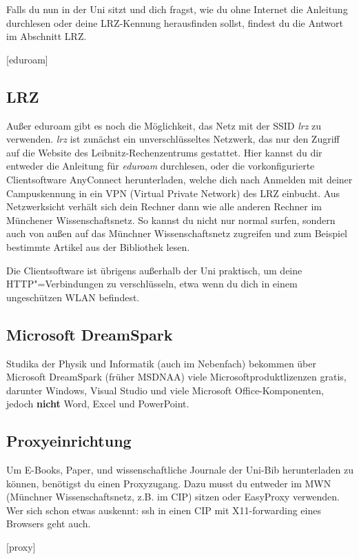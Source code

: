 Falls du nun in der Uni sitzt und dich fragst, wie du ohne Internet
die Anleitung durchlesen oder deine LRZ-Kennung herausfinden sollst, 
findest du die Antwort im Abschnitt LRZ.
\begin{urlList}
	[eduroam]
\end{urlList}

\subsection*{LRZ}
Außer eduroam gibt es noch die Möglichkeit, das Netz mit der SSID
\emph{lrz} zu verwenden. \emph{lrz} ist zunächst ein unverschlüsseltes
Netzwerk, das nur den Zugriff auf die Website des
Leibnitz-Rechenzentrums gestattet. Hier kannst du dir entweder die 
Anleitung für \emph{eduroam} durchlesen, oder die
vorkonfigurierte Clientsoftware AnyConnect herunterladen, welche dich
nach Anmelden mit deiner Campuskennung in ein VPN (Virtual Private
Network) des LRZ einbucht. Aus Netzwerksicht verhält sich dein Rechner
dann wie alle anderen Rechner im Münchener Wissenschaftsnetz. So
kannst du nicht nur normal surfen, sondern auch von außen auf das
Münchner Wissenschaftsnetz zugreifen und zum Beispiel bestimmte
Artikel aus der Bibliothek lesen.

Die Clientsoftware ist übrigens außerhalb der Uni praktisch, um deine
HTTP"=Verbindungen zu verschlüsseln, etwa wenn du dich in einem
ungeschützen WLAN befindest.

\subsection*{Microsoft DreamSpark \subjectList{\subjectI{}\subjectMI{}\subjectP{}}}
Studika der Physik und Informatik (auch im Nebenfach) bekommen über
Microsoft DreamSpark (früher MSDNAA) viele Microsoftproduktlizenzen
gratis, darunter Windows, Visual Studio und viele
Microsoft Office-Komponenten, jedoch \textbf{nicht} Word, Excel und PowerPoint.

\begin{urlList}
\end{urlList}

\subsection*{Proxyeinrichtung}
Um E-Books, Paper, und wissenschaftliche
Journale der Uni-Bib herunterladen zu können, benötigst du einen Proxyzugang.
Dazu musst du entweder im MWN (Münchner Wissenschaftsnetz, z.B. im CIP) sitzen
oder EasyProxy verwenden. Wer sich schon etwas auskennt: ssh in einen CIP mit X11-forwarding
eines Browsers geht auch.
\begin{urlList}
	[proxy]
\end{urlList}

